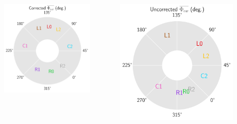 \documentclass[aspectratio=169]{beamer}
\begin{document}
	\begin{frame}
		\centering
		
		\begin{columns}
			\begin{column}{0.5\textwidth}
				\begin{figure}
					\includegraphics[width=1.\textwidth]{new_alex/radial_corrected.pdf}
				\end{figure}


			\end{column}
			
			\begin{column}{0.5\textwidth}
				\includegraphics[width=1.\textwidth]{new_alex/radial_uncorrected.pdf}
			\end{column}
			

\end{columns}
\end{frame}
\end{document}
